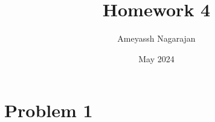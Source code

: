 \documentclass{article}
\title{Homework 4}
\author{Ameyassh Nagarajan}
\date{May 2024}
\begin{document}
\maketitle
\section{Problem 1}










\end{document}
